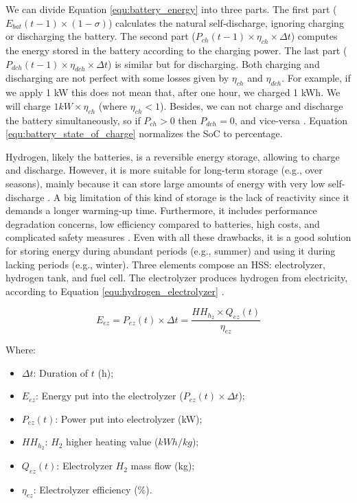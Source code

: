 We can divide Equation \ref{equ:battery_energy} into three parts. The first part ($E_{bat}(t-1) \times (1 - \sigma)$) calculates the natural self-discharge, ignoring charging or discharging the battery. The second part ($P_{ch}(t-1) \times \eta_{ch} \times \Delta t$) computes the energy stored in the battery according to the charging power. The last part ($P_{dch}(t-1) \times \eta_{dch} \times \Delta t$) is similar but for discharging. Both charging and discharging are not perfect with some losses given by $\eta_{ch}$ and $\eta_{dch}$. For example, if we apply 1 kW this does not mean that, after one hour, we charged 1 kWh. We will charge $1 kW \times \eta_{ch}$ (where $\eta_{ch} < 1$). Besides, we can not charge and discharge the battery simultaneously, so if $P_{ch} > 0$ then $P_{dch} = 0$, and vice-versa \cite{haddad2019mixed}. Equation \ref{equ:battery_state_of_charge} normalizes the SoC to percentage.

Hydrogen, likely the batteries, is a reversible energy storage, allowing to charge and discharge. However, it is more suitable for long-term storage (e.g., over seasons), mainly because it can store large amounts of energy with very low self-discharge \cite{pregger2009prospects}. A big limitation of this kind of storage is the lack of reactivity since it demands a longer warming-up time. Furthermore, it includes performance degradation concerns, low efficiency compared to batteries, high costs, and complicated safety measures \cite{rostirolla2022survey}. Even with all these drawbacks, it is a good solution for storing energy during abundant periods (e.g., summer) and using it during lacking periods (e.g., winter). Three elements compose an HSS: electrolyzer, hydrogen tank, and fuel cell. The electrolyzer produces hydrogen from electricity, according to Equation \ref{equ:hydrogen_electrolyzer} \cite{haddad2019mixed}.

\begin{equation}
    \label{equ:hydrogen_electrolyzer}
    E_{ez} = P_{ez}(t) \times \Delta t = \frac{HH_{h_{2}} \times Q_{ez}(t)}{\eta_{ez}}
\end{equation}

Where:
\begin{itemize}
    \item $\Delta t$: Duration of $t$ (h);
    \item $E_{ez}$: Energy put into the electrolyzer ($P_{ez}(t) \times \Delta t$);
    \item $P_{ez}(t)$: Power put into electrolyzer (kW);
    \item $HH_{h_{2}}$: $H_2$ higher heating value ($kWh / kg$);
    \item $Q_{ez}(t)$: Electrolyzer $H_2$ mass flow (kg);
    \item $\eta_{ez}$: Electrolyzer efficiency (\%).
\end{itemize}

